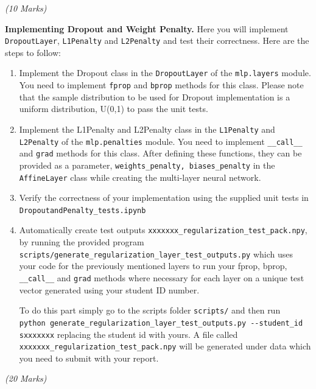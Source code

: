\documentclass[11pt,]{article}
\begin{document}
\emph{(10 Marks)}
\vspace{0.2cm}

\textbf{Implementing Dropout and Weight Penalty.}
Here you will implement \texttt{DropoutLayer}, \texttt{L1Penalty} and \texttt{L2Penalty} and test their correctness.  
Here are the steps to follow:
\begin{enumerate}
    \item Implement the Dropout class in the \texttt{DropoutLayer} of the \verb+mlp.layers+ module. You need to implement \texttt{fprop} and \texttt{bprop} methods for this class. Please note that the sample distribution to be used for Dropout implementation is a uniform distribution, U(0,1) to pass the unit tests. 
    \item Implement the L1Penalty and L2Penalty class in the \texttt{L1Penalty} and \texttt{L2Penalty} of the \verb+mlp.penalties+ module. You need to implement \texttt{\_\_call\_\_} and \texttt{grad} methods for this class. 
    After defining these functions, they can be provided as a parameter, \texttt{weights\_penalty, biases\_penalty} in the \texttt{AffineLayer} class while creating the multi-layer neural network. 
    \item Verify the correctness of your implementation using the supplied unit tests in \\ \texttt{DropoutandPenalty\_tests.ipynb} 
    \item Automatically  create  test outputs  \texttt{xxxxxxx\_regularization\_test\_pack.npy},   by  running  the  provided  program 
    \texttt{scripts/generate\_regularization\_layer\_test\_outputs.py} which uses your code for the previously mentioned layers to run your fprop, bprop, \texttt{\_\_call\_\_} and \texttt{grad} methods where necessary for each layer on a unique test vector generated using your student 
    ID number.
    
    To do this part simply go to the scripts folder \texttt{scripts/} and then run \\ \texttt{python generate\_regularization\_layer\_test\_outputs.py -{}-student\_id sxxxxxxx} replacing the student id with yours. A file called \texttt{xxxxxxx\_regularization\_test\_pack.npy} will be generated under data which you need to submit with your report.
\end{enumerate}

\emph{(20 Marks)}
\vspace{0.2cm}
\end{document}
